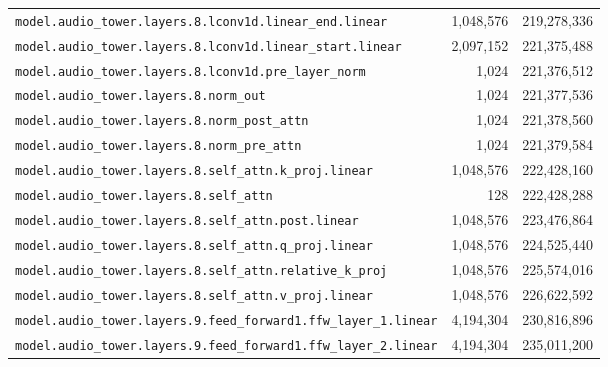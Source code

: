 \documentclass[10pt,a4paper]{article}
\theoremstyle{definition}
\begin{document}
\begin{appendices}
\begin{longtable}{p{9.5cm}rr}
\texttt{model.\allowbreak{}audio\_tower.\allowbreak{}layers.\allowbreak{}8.\allowbreak{}lconv1d.\allowbreak{}linear\_end.\allowbreak{}linear} & 1,048,576 & 219,278,336 \\
\texttt{model.\allowbreak{}audio\_tower.\allowbreak{}layers.\allowbreak{}8.\allowbreak{}lconv1d.\allowbreak{}linear\_start.\allowbreak{}linear} & 2,097,152 & 221,375,488 \\
\texttt{model.\allowbreak{}audio\_tower.\allowbreak{}layers.\allowbreak{}8.\allowbreak{}lconv1d.\allowbreak{}pre\_layer\_norm} & 1,024 & 221,376,512 \\
\texttt{model.\allowbreak{}audio\_tower.\allowbreak{}layers.\allowbreak{}8.\allowbreak{}norm\_out} & 1,024 & 221,377,536 \\
\texttt{model.\allowbreak{}audio\_tower.\allowbreak{}layers.\allowbreak{}8.\allowbreak{}norm\_post\_attn} & 1,024 & 221,378,560 \\
\texttt{model.\allowbreak{}audio\_tower.\allowbreak{}layers.\allowbreak{}8.\allowbreak{}norm\_pre\_attn} & 1,024 & 221,379,584 \\
\texttt{model.\allowbreak{}audio\_tower.\allowbreak{}layers.\allowbreak{}8.\allowbreak{}self\_attn.\allowbreak{}k\_proj.\allowbreak{}linear} & 1,048,576 & 222,428,160 \\
\texttt{model.\allowbreak{}audio\_tower.\allowbreak{}layers.\allowbreak{}8.\allowbreak{}self\_attn} & 128 & 222,428,288 \\
\texttt{model.\allowbreak{}audio\_tower.\allowbreak{}layers.\allowbreak{}8.\allowbreak{}self\_attn.\allowbreak{}post.\allowbreak{}linear} & 1,048,576 & 223,476,864 \\
\texttt{model.\allowbreak{}audio\_tower.\allowbreak{}layers.\allowbreak{}8.\allowbreak{}self\_attn.\allowbreak{}q\_proj.\allowbreak{}linear} & 1,048,576 & 224,525,440 \\
\texttt{model.\allowbreak{}audio\_tower.\allowbreak{}layers.\allowbreak{}8.\allowbreak{}self\_attn.\allowbreak{}relative\_k\_proj} & 1,048,576 & 225,574,016 \\
\texttt{model.\allowbreak{}audio\_tower.\allowbreak{}layers.\allowbreak{}8.\allowbreak{}self\_attn.\allowbreak{}v\_proj.\allowbreak{}linear} & 1,048,576 & 226,622,592 \\
\texttt{model.\allowbreak{}audio\_tower.\allowbreak{}layers.\allowbreak{}9.\allowbreak{}feed\_forward1.\allowbreak{}ffw\_layer\_1.\allowbreak{}linear} & 4,194,304 & 230,816,896 \\
\texttt{model.\allowbreak{}audio\_tower.\allowbreak{}layers.\allowbreak{}9.\allowbreak{}feed\_forward1.\allowbreak{}ffw\_layer\_2.\allowbreak{}linear} & 4,194,304 & 235,011,200 \\

\end{longtable}
\end{appendices}
\end{document}
